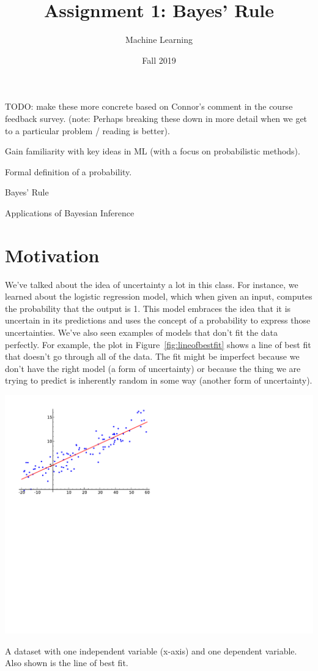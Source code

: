 \documentclass[assignment01_Solutions]{subfiles}
\title{Assignment 1: Bayes' Rule}
\author{Machine Learning}
\date{Fall 2019}
\begin{document}
\maketitle
\thispagestyle{firstpage}


TODO: make these more concrete based on Connor's comment in the course feedback survey. (note: Perhaps breaking these down in more detail when we get to a particular problem / reading is better).

\begin{learningobjectives}
\bi
\item Gain familiarity with key ideas in ML (with a focus on probabilistic methods).
\item Formal definition of a probability.
\item Bayes' Rule
\item Applications of Bayesian Inference
\ei
\end{learningobjectives}

\section{Motivation}
We’ve talked about the idea of uncertainty a lot in this class.  For instance, we learned about the logistic regression model, which when given an input, computes the probability that the output is 1.  This model embraces the idea that it is uncertain in its predictions and uses the concept of a probability to express those uncertainties.  We’ve also seen examples of models that don’t fit the data perfectly.  For example, the plot in Figure~\ref{fig:lineofbestfit} shows a line of best fit that doesn't go through all of the data.  The fit might be imperfect because we don't have the right model (a form of uncertainty) or because the thing we are trying to predict is inherently random in some way (another form of uncertainty).
\begin{marginfigure}
\includegraphics[width=\linewidth]{figures/line_of_best_fit.pdf}
\caption{A dataset with one independent variable (x-axis) and one dependent variable.  Also shown is the line of best fit.\label{fig:lineofbestfit}}
\end{marginfigure}
\end{document}
